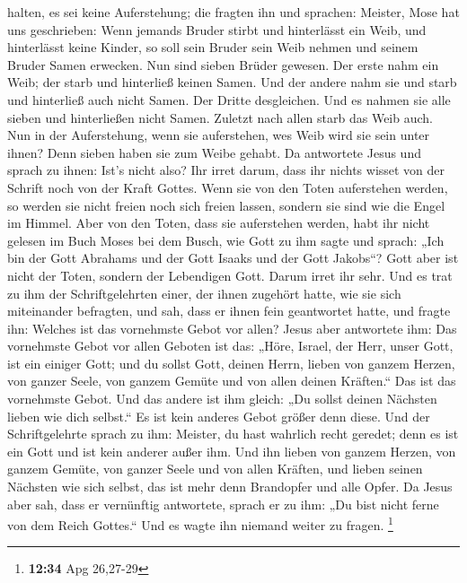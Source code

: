 halten, es sei keine Auferstehung; die fragten ihn und sprachen:
 Meister, Mose hat uns geschrieben: Wenn jemands Bruder
stirbt und hinterlässt ein Weib, und hinterlässt keine Kinder, so soll
sein Bruder sein Weib nehmen und seinem Bruder Samen erwecken.
 Nun sind sieben Brüder gewesen. Der erste nahm ein Weib;
der starb und hinterließ keinen Samen.  Und der andere
nahm sie und starb und hinterließ auch nicht Samen. Der Dritte
desgleichen.  Und es nahmen sie alle sieben und
hinterließen nicht Samen. Zuletzt nach allen starb das Weib auch.
 Nun in der Auferstehung, wenn sie auferstehen, wes Weib
wird sie sein unter ihnen? Denn sieben haben sie zum Weibe gehabt.
 Da antwortete Jesus und sprach zu ihnen: Ist's nicht
also? Ihr irret darum, dass ihr nichts wisset von der Schrift noch von
der Kraft Gottes.  Wenn sie von den Toten auferstehen
werden, so werden sie nicht freien noch sich freien lassen, sondern sie
sind wie die Engel im Himmel.  Aber von den Toten, dass
sie auferstehen werden, habt ihr nicht gelesen im Buch Moses bei dem
Busch, wie Gott zu ihm sagte und sprach: „Ich bin der Gott Abrahams und
der Gott Isaaks und der Gott Jakobs``?  Gott aber ist
nicht der Toten, sondern der Lebendigen Gott. Darum irret ihr sehr.
 Und es trat zu ihm der Schriftgelehrten einer, der ihnen
zugehört hatte, wie sie sich miteinander befragten, und sah, dass er
ihnen fein geantwortet hatte, und fragte ihn: Welches ist das vornehmste
Gebot vor allen?  Jesus aber antwortete ihm: Das
vornehmste Gebot vor allen Geboten ist das: „Höre, Israel, der Herr,
unser Gott, ist ein einiger Gott;  und du sollst Gott,
deinen Herrn, lieben von ganzem Herzen, von ganzer Seele, von ganzem
Gemüte und von allen deinen Kräften.`` Das ist das vornehmste Gebot.
 Und das andere ist ihm gleich: „Du sollst deinen
Nächsten lieben wie dich selbst.`` Es ist kein anderes Gebot größer denn
diese.  Und der Schriftgelehrte sprach zu ihm: Meister,
du hast wahrlich recht geredet; denn es ist ein Gott und ist kein
anderer außer ihm.  Und ihn lieben von ganzem Herzen, von
ganzem Gemüte, von ganzer Seele und von allen Kräften, und lieben seinen
Nächsten wie sich selbst, das ist mehr denn Brandopfer und alle Opfer.
 Da Jesus aber sah, dass er vernünftig antwortete, sprach
er zu ihm: „Du bist nicht ferne von dem Reich Gottes.`` Und es wagte ihn
niemand weiter zu fragen. \footnote{\textbf{12:34} Apg 26,27-29}
